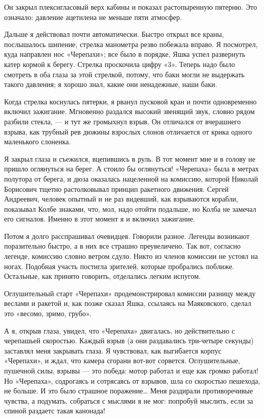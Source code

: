 Он закрыл плексигласовый верх кабины и показал растопыренную пятерню.  Это
означало: давление ацетилена не меньше пяти атмосфер.

Дальше  я  действовал  почти  автоматически.  Быстро  открыл  все   краны,
послышалось шипение, стрелка манометра резво побежала вправо. Я посмотрел,
куда направлен нос «Черепахи»; все  было в порядке, Яшка успел  развернуть
катер кормой  к берегу.  Стрелка проскочила  цифру «3».  Теперь надо  было
смотреть в оба глаза за этой стрелкой, потому, что баки могли не выдержать
такого давления; я хорошо знал, какие они ненадежные, наши баки.

Когда  стрелка  коснулась  пятерки,  я   рванул  пусковой  кран  и   почти
одновременно включил зажигание. Мгновенно раздался высокий звенящий  звук,
словно рядом разбили стекла, — и  тут же громыхнул взрыв. Он отличался  от
вчерашнего взрыва, как  трубный рев дюжины  взрослых слонов отличается  от
крика одного маленького слоненка.

Я закрыл глаза и съежился, вцепившись в руль. В тот момент мне и в  голову
не пришло оглянуться на берег. А  стоило бы оглянуться! «Черепаха» была  в
метрах полутора  от  берега,  и дюза  оказалась  нацеленной  на  комиссию,
которой Николай Борисович тщетно растолковывал принцип ракетного движения.
Сергей Андреевич,  человек  опытный  и не  раз  видевший,  как  взрываются
корабли, показывал Колбе знаками, что, мол, надо отойти подальше, но Колба
не замечал его сигналов. Именно в этот момент я и включил зажигание.

Потом я долго расспрашивал  очевидцев. Говорили разное. Легенды  возникают
поразительно быстро, а в них  все страшно преувеличено. Так вот,  согласно
легенде, комиссию словно ветром сдуло. Никто из членов комиссии не  устоял
на ногах. Подобная участь  постигла зрителей, которые пробрались  поближе.
Остальные, как принято говорить, отделались легким испугом.

Оглушительный старт  «Черепахи» продемонстрировал  комиссии разницу  между
веслами и  ракетой и,  как  позже сказал  Яшка, ссылаясь  на  Маяковского,
сделал это «весомо, зримо, грубо».

А я, открыв глаза,  увидел, что «Черепаха»  двигалась, но действительно  с
черепашьей скоростью. Каждый взрыв (а они раздавались три-четыре  секунды)
заставлял меня  закрывать  глаза.  Я  чувствовал,  как  выгибается  корпус
«Черепахи», и ждал,  что камера сгорани  вот-вот сорвется.  Оглушительные,
пушечной силы,  взрывы  — это  победа:  мотор  работал и  еще  как  громко
работал! Но  «Черепаха»,  содрогаясь  и  сотрясаясь  от  взрывов,  шла  со
скоростью пешехода,  не  больше.  И  это  было  страшное  поражение…  Меня
раздирали противоречивые чувства,  а подумать,  собраться с  мыслями я  не
мог: попробуй мыслить, если за спиной раздаетс такая канонада!

